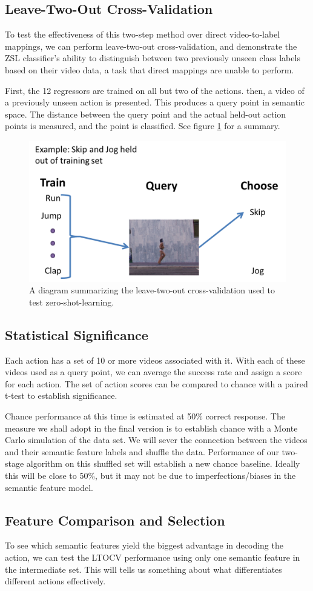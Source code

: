 \documentclass{article}
\begin{document}
\subsection{Leave-Two-Out Cross-Validation}
To test the effectiveness of this two-step method over direct video-to-label mappings, we can perform leave-two-out cross-validation, and demonstrate the ZSL classifier’s ability to distinguish between two previously unseen class labels based on their video data, a task that direct mappings are unable to perform.

First, the 12 regressors are trained on all but two of the actions.  then, a video of a previously unseen action is presented. This produces a query point in semantic space.  The distance between the query point and the actual held-out action points is measured, and the point is classified. See figure \ref{ltocv} for a summary.

\begin{figure}[h]
\centering
\includegraphics[width = .4\linewidth]{ltocv}
\caption{A diagram summarizing the leave-two-out cross-validation used to test zero-shot-learning.}
\label{ltocv}
\end{figure}
\subsection{Statistical Significance}
Each action has a set of 10 or more videos associated with it. With each of these videos used as a query point, we can average the success rate and assign a score for each action. The set of action scores can be compared to chance with a paired t-test to establish significance.

Chance performance at this time is estimated at 50\% correct response.  The measure we shall adopt in the final version is to establish chance with a Monte Carlo simulation of the data set. We will sever the connection between the videos and their semantic feature labels and shuffle the data. Performance of our two-stage algorithm on this shuffled set will establish a new chance baseline. Ideally this will be close to 50\%, but it may not be due to imperfections/biases in the semantic feature model.
\label{stats}
\subsection{Feature Comparison and Selection}
To see which semantic features yield the biggest advantage in decoding the action, we can test the LTOCV performance using only one semantic feature in the intermediate set. This will tells us something about what differentiates different actions effectively.
\end{document}
